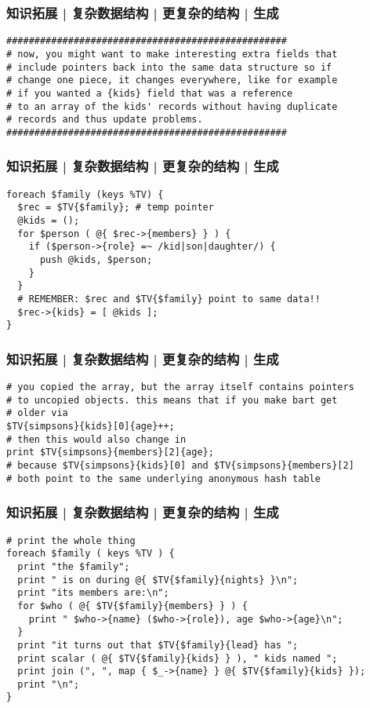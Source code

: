 \begin{frame}[fragile]
  \frametitle{知识拓展 | 复杂数据结构 | 更复杂的结构 | 生成}
\begin{lstlisting}[basicstyle=\small\tt]
##################################################
# now, you might want to make interesting extra fields that
# include pointers back into the same data structure so if
# change one piece, it changes everywhere, like for example
# if you wanted a {kids} field that was a reference
# to an array of the kids' records without having duplicate
# records and thus update problems.
##################################################
\end{lstlisting}
\end{frame}

\begin{frame}[fragile]
  \frametitle{知识拓展 | 复杂数据结构 | 更复杂的结构 | 生成}
\begin{lstlisting}
foreach $family (keys %TV) {
  $rec = $TV{$family}; # temp pointer
  @kids = ();
  for $person ( @{ $rec->{members} } ) {
    if ($person->{role} =~ /kid|son|daughter/) {
      push @kids, $person;
    }
  }
  # REMEMBER: $rec and $TV{$family} point to same data!!
  $rec->{kids} = [ @kids ];
}
\end{lstlisting}
\end{frame}

\begin{frame}[fragile]
  \frametitle{知识拓展 | 复杂数据结构 | 更复杂的结构 | 生成}
\begin{lstlisting}
# you copied the array, but the array itself contains pointers
# to uncopied objects. this means that if you make bart get
# older via
$TV{simpsons}{kids}[0]{age}++;
# then this would also change in
print $TV{simpsons}{members}[2]{age};
# because $TV{simpsons}{kids}[0] and $TV{simpsons}{members}[2]
# both point to the same underlying anonymous hash table
\end{lstlisting}
\end{frame}

\begin{frame}[fragile]
  \frametitle{知识拓展 | 复杂数据结构 | 更复杂的结构 | 生成}
  \vspace{-0.6em}
\begin{lstlisting}[basicstyle=\small\tt]
# print the whole thing
foreach $family ( keys %TV ) {
  print "the $family";
  print " is on during @{ $TV{$family}{nights} }\n";
  print "its members are:\n";
  for $who ( @{ $TV{$family}{members} } ) {
    print " $who->{name} ($who->{role}), age $who->{age}\n";
  }
  print "it turns out that $TV{$family}{lead} has ";
  print scalar ( @{ $TV{$family}{kids} } ), " kids named ";
  print join (", ", map { $_->{name} } @{ $TV{$family}{kids} });
  print "\n";
}
\end{lstlisting}
\end{frame}

